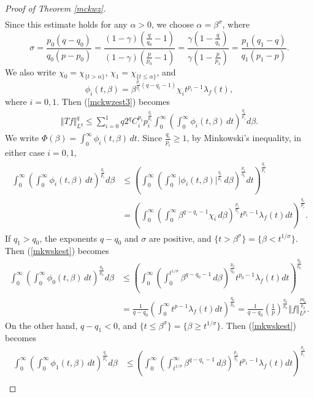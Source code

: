 \documentclass{article}
\numberwithin{equation}{section}
\theoremstyle{plain}
\theoremstyle{definition}
\begin{document}
\begin{proof}[Proof of Theorem \ref{mckwz}]
\begin{align}
	\end{align}
Since this estimate holds for any $\alpha>0$, we choose $\alpha=\beta^\sigma$, where $$\sigma=\frac{p_0(q-q_0)}{q_0(p-p_0)}=\frac{(1-\gamma)\left(\frac{q}{q_0}-1\right)}{(1-\gamma)\left(\frac{p}{p_0}-1\right)}=\frac{\gamma\left(1-\frac{q}{q_1}\right)}{\gamma\left(1-\frac{p}{p_1}\right)}=\frac{p_1(q_1-q)}{q_1(p_1-p)}.$$ 
We also write $\chi_0=\chi_{\{t>\alpha\}}$, $\chi_1=\chi_{\{t\leq\alpha\}}$, and $$\phi_i(t,\beta)=\beta^{\frac{p_i}{q_i}(q-q_i-1)}\chi_i t^{p_i-1}\lambda_f(t),$$ where $i=0,1$. Then (\ref{mckwzest3}) becomes
\begin{align}
\Vert Tf\Vert_{L^q}^q\leq\sum_{i=0}^1q2^qC_i^{p_i}p_i^{\frac{q_i}{p_i}}\int_0^\infty\left(\int_0^\infty\phi_i(t,\beta)\,dt\right)^{\frac{q_i}{p_i}}d\beta.\label{mckwzest4}
\end{align}
We write $\Phi(\beta)=\int_0^\infty\phi_i(t,\beta)\,dt$. Since $\frac{q_i}{p_i}\geq 1$, by Minkowski's inequality, in either case $i=0,1$,
\begin{align}
\begin{aligned}
	\int_0^\infty\left(\int_0^\infty\phi_i(t,\beta)\,dt\right)^{\frac{q_i}{p_i}}d\beta&\leq\left(\int_0^\infty\left(\int_0^\infty\vert\phi_i(t,\beta)\vert^{\frac{q_i}{p_i}}\,d\beta\right)^{\frac{p_i}{q_i}}dt\right)^{\frac{q_i}{p_i}}\\
	&=\left(\int_0^\infty\left(\int_0^\infty\beta^{q-q_i-1}\chi_i\,d\beta\right)^{\frac{p_i}{q_i}}t^{p_i-1}\lambda_f(t)dt\right)^{\frac{q_i}{p_i}}.
\end{aligned}\label{mkwskest}
\end{align}
If $q_1>q_0$, the exponents $q-q_0$ and $\sigma$ are positive, and $\{t>\beta^\sigma\}=\{\beta<t^{1/\sigma}\}$. Then (\ref{mkwskest}) becomes
\begin{align*}
	\int_0^\infty\left(\int_0^\infty\phi_0(t,\beta)\,dt\right)^{\frac{q_0}{p_0}}d\beta&\leq\left(\int_0^\infty\left(\int_0^{t^{1/\sigma}}\beta^{q-q_0-1}\,d\beta\right)^{\frac{p_0}{q_0}}t^{p_0-1}\lambda_f(t)dt\right)^{\frac{q_0}{p_0}}\\ &=\frac{1}{q-q_0}\left(\int_0^\infty t^{p-1}\lambda_f(t)dt\right)^{\frac{q_0}{p_0}}=\frac{1}{q-q_0}\left(\frac{1}{p}\right)^{\frac{q_0}{p_0}}\Vert f\Vert_{L^p}^{\frac{pq_0}{p_0}}.
\end{align*}
On the other hand, $q-q_1<0$, and $\{t\leq\beta^\sigma\}=\{\beta\geq t^{1/\sigma}\}$. Then (\ref{mkwskest}) becomes
\begin{align*}
	\int_0^\infty\left(\int_0^\infty\phi_1(t,\beta)\,dt\right)^{\frac{q_1}{p_1}}d\beta &\leq\left(\int_0^\infty\left(\int_{t^{1/\sigma}}^\infty\beta^{q-q_1-1}\,d\beta\right)^{\frac{p_1}{q_1}}t^{p_1-1}\lambda_f(t)dt\right)^{\frac{q_1}{p_1}} \\

\end{align*}
\end{proof}
\end{document}
